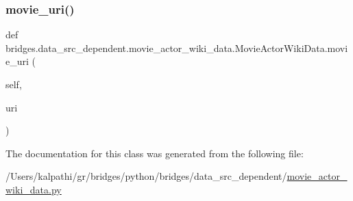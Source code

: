 \mbox{\label{classbridges_1_1data__src__dependent_1_1movie__actor__wiki__data_1_1_movie_actor_wiki_data_ae9e09370897da0ed4daa3a9378907b50}} 
\subsubsection{\texorpdfstring{movie\_uri()}{movie\_uri()}\hspace{0.1cm}{\footnotesize\ttfamily [2/2]}}
{\footnotesize\ttfamily def bridges.\+data\+\_\+src\+\_\+dependent.\+movie\+\_\+actor\+\_\+wiki\+\_\+data.\+Movie\+Actor\+Wiki\+Data.\+movie\+\_\+uri (\begin{DoxyParamCaption}\item[{}]{self,  }\item[{}]{uri }\end{DoxyParamCaption})}



The documentation for this class was generated from the following file\+:\begin{DoxyCompactItemize}
\item 
/\+Users/kalpathi/gr/bridges/python/bridges/data\+\_\+src\+\_\+dependent/\mbox{\hyperlink{movie__actor__wiki__data_8py}{movie\+\_\+actor\+\_\+wiki\+\_\+data.\+py}}\end{DoxyCompactItemize}
